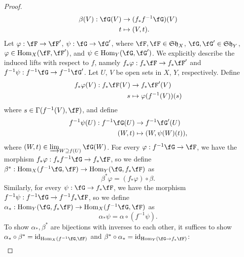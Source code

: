\documentclass[a4paper]{article}
\begin{document}
\begin{enumerate} [label=\textbf{\arabic*.}, leftmargin=0em]
\begin{proof}
              \begin{align*}
                  \beta(V) : \fG(V) & \to (f_* f^{-1} \fG)(V) \\
                  t                 & \mapsto (V, t).
              \end{align*}
              Let $\varphi : \fF \to \fF'$, $\psi : \fG \to \fG'$, where $\fF, \fF \in \mathfrak{Sh}_X$, $\fG, \fG' \in \mathfrak{Sh}_Y$, $\varphi \in \Hom_X(\fF, \fF')$, and $\psi \in \Hom_Y(\fG, \fG')$. We explicitly describe the induced lifts with respect to $f$, namely $f_*\varphi : f_* \fF \to f_* \fF'$ and $f^{-1} \psi : f^{-1} \fG \to f^{-1} \fG'$. Let $U$, $V$ be open sets in $X$, $Y$, respectively. Define
              \begin{align*}
                  f_* \varphi(V) : f_* \fF(V) & \to  f_* \fF'(V)              \\
                  s                           & \mapsto \varphi(f^{-1}(V))(s)
              \end{align*}
              where $s \in \Gamma(f^{-1}(V), \fF)$, and define
              \begin{align*}
                  f^{-1} \psi(U) : f^{-1} \fG(U) & \to f^{-1} \fG'(U)       \\
                  (W, t)                         & \mapsto (W, \psi(W)(t)),
              \end{align*}
              where $(W, t) \in \varinjlim_{W \supseteq f(U)} \fG(W)$. For every $\varphi : f^{-1} \fG \to \fF$, we have the morphism $f_* \varphi : f_* f^{-1} \fG \to f_* \fF$, so we define $\beta^* : \Hom_X(f^{-1} \fG, \fF) \to \Hom_Y(\fG, f_* \fF)$ as
              \begin{equation*}
                  \beta^* \varphi = (f_* \varphi) \circ \beta.
              \end{equation*}
              Similarly, for every $\psi : \fG \to f_* \fF$, we have the morphism $f^{-1} \psi : f^{-1} \fG \to f^{-1} f_* \fF$, so we define $\alpha_* : \Hom_Y(\fG, f_* \fF) \to \Hom_X(f^{-1} \fG, \fF)$ as
              \begin{equation*}
                  \alpha_* \psi = \alpha \circ (f^{-1} \psi).
              \end{equation*}
              To show $\alpha_*, \beta^*$ are bijections with inverses to each other, it suffices to show $\alpha_* \circ \beta^* = \text{id}_{\Hom_X(f^{-1} \fG, \fF)}$ and $\beta^* \circ \alpha_* = \text{id}_{\Hom_Y(\fG \to f_* \fF)}$:
              \begin{align*}

\end{align*}
\end{proof}
\end{enumerate}
\end{document}
